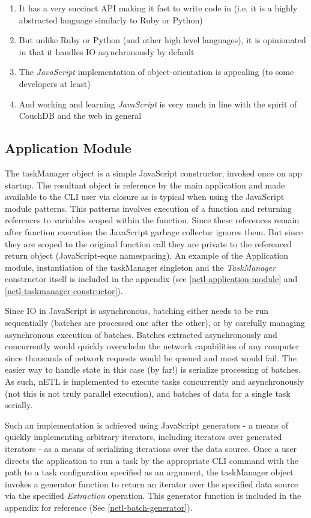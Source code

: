 \begin{enumerate}
    \item It has a very succinct API making it fast to write code in (i.e. it is a highly abstracted language similarly to Ruby or Python)
    \item But unlike Ruby or Python (and other high level languages), it is opinionated in that it handles IO asynchronously by default
    \item The \textit{JavaScript} implementation of object-orientation is appealing (to some developers at least)
    \item And working and learning \textit{JavaScript} is very much in line with the spirit of CouchDB and the web in general
\end{enumerate}

\subsection{Application Module}
The taskManager object is a simple JavaScript constructor, invoked once on app startup. The resultant object is reference by the main application and made available to the CLI user via closure as is typical when using the JavaScript module patterns. This patterns involves execution of a function and returning references to variables scoped within the function. Since these references remain after function execution the JavaScript garbage collector ignores them. But since they are scoped to the original function call they are private to the referenced return object (JavaScript-eque namespacing). An example of the Application module, instantiation of the taskManager singleton and the \textit{TaskManager} constructor itself is included in the appendix (see \ref{netl-application-module} and \ref{netl-taskmanager-constructor}).

Since IO in JavaScript is asynchronous, batching either needs to be run sequentially (batches are processed one after the other), or by carefully managing asynchronous execution of batches. Batches extracted asynchronously and concurrently would quickly overwhelm the network capabilities of any computer since thousands of network requests would be queued and most would fail. The easier way to handle state in this case (by far!) is serialize processing of batches. As such, nETL is implemented to execute tasks concurrently and asynchronously (not this is not truly parallel execution), and batches of data for a single task serially.

Such an implementation is achieved using JavaScript generators - a means of quickly implementing arbitrary iterators, including iterators over generated iterators \cite{mozillaGenerators} - as a means of serializing iterations over the data source. Once a user directs the application to run a task by the appropriate CLI command with the path to a task configuration specified as an argument, the taskManager object invokes a generator function to return an iterator over the specified data source via the specified \textit{Extraction} operation. This generator function is included in the appendix for reference (See \ref{netl-batch-generator}).

